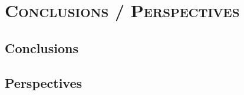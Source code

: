 \documentclass[xcolor=x11names, compress, 11pt]{beamer}
\begin{document}
\section{\scshape Conclusions / Perspectives}


\subsection{Conclusions}
\begin{frame}[c]
    \vfill
    \vfill
\end{frame}


\subsection{Perspectives}
\begin{frame}[c]
    \vfill
    \vfill
\end{frame}













\end{document}
